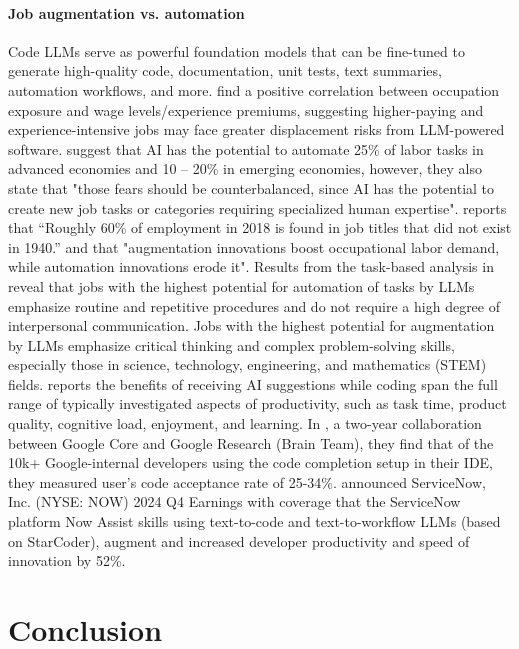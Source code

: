 \documentclass[10pt]{article} %
\begin{document}
\paragraph{Job augmentation vs. automation} Code LLMs serve as powerful foundation models that can be fine-tuned to generate high-quality code, documentation, unit tests, text summaries, automation workflows, and more. \citet{chen2023jobs} find a positive correlation between occupation exposure and wage levels/experience premiums, suggesting higher-paying and experience-intensive jobs may face greater displacement risks from LLM-powered software. \citet{goldmansachs2024generativeworld} suggest that AI has the potential to automate 25\% of labor tasks in advanced economies and 10 – 20\% in emerging economies, however, they also state that "those fears should be counterbalanced, since AI has the potential to create new job tasks or categories requiring specialized human expertise". \citet{autor2022newfrontiers} reports that “Roughly 60\% of employment in 2018 is found in job titles that did not exist in 1940.” and that "augmentation innovations boost occupational labor demand, while automation innovations erode it". Results from the task-based analysis in \citep{weforum2024jobsoftomorrow} reveal that jobs with the highest potential for automation of tasks by LLMs emphasize routine and repetitive procedures and do not require a high degree of interpersonal communication. Jobs with the highest potential for augmentation by LLMs emphasize critical thinking and complex problem-solving skills, especially those in science, technology, engineering, and mathematics (STEM) fields. \citet{ziegler2024measuring} reports the benefits of receiving AI suggestions while coding span the full range of typically investigated aspects of productivity, such as task time, product quality, cognitive load, enjoyment, and learning. In \citep{peng2023impact}, a two-year collaboration between Google Core and Google Research (Brain Team), they find that of the 10k+ Google-internal developers using the code completion setup in their IDE, they measured user's code acceptance rate of 25-34\%. \citet{servicenow2024q4earnings} announced ServiceNow, Inc. (NYSE: NOW) 2024 Q4 Earnings with coverage that the ServiceNow platform Now Assist skills using text-to-code \citep{servicenow2024texttocode} and text-to-workflow \citep{servicenow2024text2flow} LLMs (based on StarCoder), augment and increased developer productivity and speed of innovation by 52\%. 


\section{Conclusion}
\end{document}
